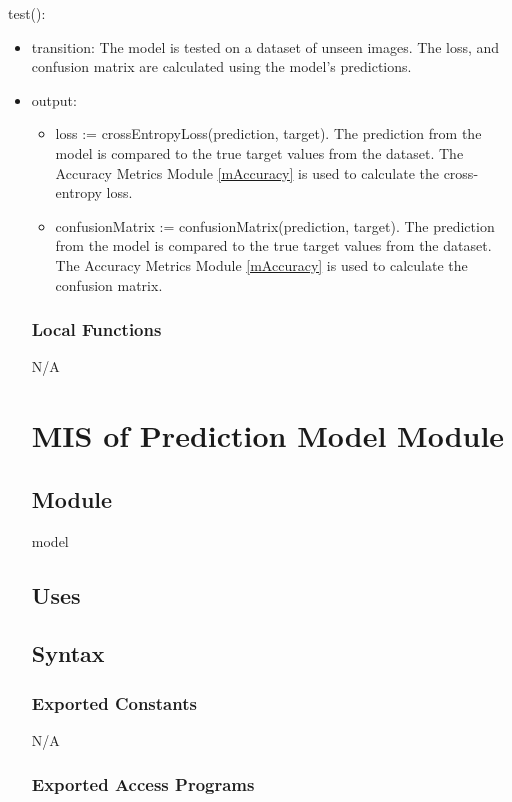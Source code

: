 \documentclass[12pt, titlepage]{article}
\begin{document}
\noindent test():
\begin{itemize}
\item transition: The model is tested on a dataset of unseen images. The loss,
and confusion matrix are calculated using the model's predictions.
\item output:
\begin{itemize}
  \item loss := crossEntropyLoss(prediction, target). The prediction from the
  model is compared to the true target values from the dataset. The Accuracy
  Metrics Module \ref{mAccuracy} is used to calculate the cross-entropy loss.
  \item confusionMatrix := confusionMatrix(prediction, target). The prediction
  from the model is compared to the true target values from the dataset. The
  Accuracy Metrics Module \ref{mAccuracy} is used to calculate the confusion
  matrix.
\end{itemize}

\subsubsection{Local Functions}

N/A


\section{MIS of Prediction Model Module} \label{MModel}

\subsection{Module}

model

\subsection{Uses}


\subsection{Syntax}

\subsubsection{Exported Constants}

N/A

\subsubsection{Exported Access Programs}


\end{itemize}
\end{document}
